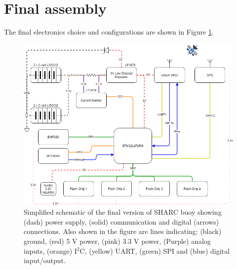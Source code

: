 \section{Final assembly}
\label{sec:ch3_final_assembly}

The final electronics choice and configurations are shown in Figure \ref{fig:sharc_final}.

\begin{landscape}
	\centering
	\vspace*{\fill}
	\begin{figure}[htpb]
		\centering
		\captionsetup{font=footnotesize}
		\includegraphics[height=0.6\textwidth,width=1.2\textheight]{figs/SHARC_Final.png}
		\caption{Simplified schematic of the final version of SHARC buoy showing (dash) power supply, (solid) communication and digital (arrows) connections. Also shown in the figure are lines indicating: (black) ground, (red) 5 V power, (pink) 3.3 V power, (Purple) analog inputs, (orange) I$^2$C, (yellow) UART, (green) SPI and (blue) digital input/output.}
		\label{fig:sharc_final}
	\end{figure}
	\vfill
\end{landscape}


